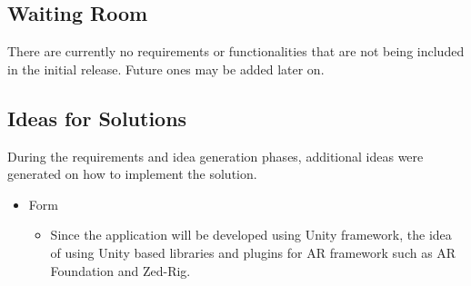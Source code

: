 \documentclass[12pt]{article}
\begin{document}
\subsection{Waiting Room}
There are currently no requirements or functionalities that are not being included in the initial release. Future ones may be added later on.

\subsection{Ideas for Solutions}
During the requirements and idea generation phases, additional ideas were generated on how to implement the solution.
\begin{itemize}
    \item Form
    \begin{itemize}
        \item Since the application will be developed using Unity framework, the idea of using Unity based libraries and plugins for AR framework such as AR Foundation and Zed-Rig.
    \end{itemize}
\end{itemize}


\end{document}
